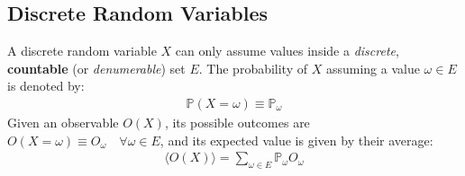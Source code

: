 \documentclass[../../main.tex]{subfiles}
\begin{document}
\subsection{Discrete Random Variables}
A discrete random variable $X$ can only assume values inside a \textit{discrete}, \textbf{countable} (or \textit{denumerable}) set $E$. The probability of $X$ assuming a value $\omega \in E$ is denoted by:
\begin{align*}
    \mathbb{P}(X=\omega) \equiv \mathbb{P}_\omega
\end{align*}
Given an observable $O(X)$, its possible outcomes are $O(X=\omega) \equiv O_\omega\quad \forall \omega \in E$, and its expected value is given by their average:
\begin{align*}
    \langle O(X) \rangle = \sum_{\omega \in E} \mathbb{P}_\omega O_\omega
\end{align*}
\end{document}
